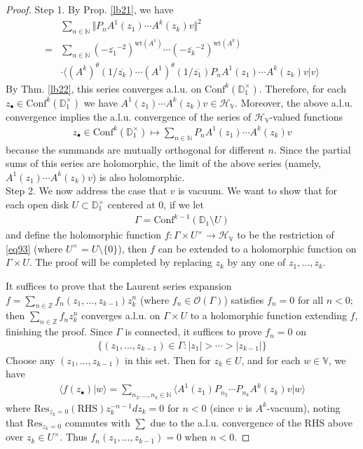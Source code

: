 \documentclass[12pt,b5paper,notitlepage]{article}
\theoremstyle{definition}
\theoremstyle{plain}
\newcommand{\mc}{\mathcal}
\newcommand{\ovl}{\overline}
\newcommand{\Conf}{\mathrm{Conf}}
\newcommand{\Res}{\mathrm{Res}}
\newcommand{\bk}[1]{\langle {#1}\rangle}
\newcommand{\scr}{\mathscr}
\newcommand{\blt}{\bullet}
\newcommand{\Vbb}{\mathbb V}
\newcommand{\Nbb}{\mathbb N}
\newcommand{\Zbb}{\mathbb Z}
\newcommand{\Dbb}{\mathbb D}
\newcommand{\wt}{\mathrm{wt}}
\newcommand{\HV}{\mathcal H_{\mathbb V}}
\numberwithin{equation}{section}
\begin{document}
\begin{proof}
Step 1. By Prop. \ref{lb21}, we have
\begin{align*}
&\sum_{n\in\Nbb}\Vert P_n  A^1(z_1)\cdots A^k(z_k)v\Vert^2\\
=&\sum_{n\in\Nbb}(-\ovl{z_1}^{-2})^{\wt(A^1)}\cdots(-\ovl{z_k}^{-2})^{\wt(A^k)}\\
&\cdot\bk{(A^k)^\theta(1/\ovl{z_k})\cdots (A^1)^\theta(1/\ovl{z_1})P_nA^1(z_1)\cdots A^k(z_k)v|v}
\end{align*}
By Thm. \ref{lb22}, this series converges a.l.u. on $\Conf^k(\Dbb_1^\times)$. Therefore, for each $z_\blt\in \Conf^k(\Dbb_1^\times)$ we have $A^1(z_1)\cdots A^k(z_k)v\in\mc H_\Vbb$. Moreover, the above a.l.u. convergence implies the a.l.u. convergence of the series of $\mc H_\Vbb$-valued functions
\begin{align*}
z_\blt\in\Conf^k(\Dbb_1^\times)\mapsto\sum_{n\in\Nbb}P_n A^1(z_1)\cdots A^k(z_k)v
\end{align*}
because the summands are mutually orthogonal for different $n$. Since the partial sums of this series are holomorphic, the limit of the above series (namely, $A^1(z_1)\cdots A^k(z_k)v$) is also holomorphic.\\[-1ex]

Step 2. We now address the case that $v$ is vacuum. We want to show that for each open disk $U\subset\Dbb_1^\times$ centered at $0$, if we let
\begin{align*}
\Gamma=\Conf^{k-1}(\Dbb_1\setminus U)
\end{align*} 
and define the holomorphic function $f:\Gamma\times U^\times\rightarrow\HV$ to be the restriction of \eqref{eq93} (where $U^\times=U\setminus\{0\}$), then $f$ can be extended to a holomorphic function on $\Gamma\times U$. The proof will be completed by replacing $z_k$ by any one of $z_1,\dots,z_k$. 

It suffices to prove that the Laurent series expansion $f=\sum_{n\in\Zbb}f_n(z_1,\dots,z_{k-1})z_k^n$ (where $f_n\in\scr O(\Gamma)$) satisfies $f_n=0$ for all $n<0$; then $\sum_{n\in\Zbb}f_nz_k^n$ converges a.l.u. on $\Gamma\times U$ to a holomorphic function extending $f$, finishing the proof. Since $\Gamma$ is connected, it suffices to prove $f_n=0$ on 
\begin{align*}
\{(z_1,\dots,z_{k-1})\in\Gamma:|z_1|>\cdots>|z_{k-1}|\}
\end{align*}
Choose any $(z_1,\dots,z_{k-1})$ in this set. Then for $z_k\in U$, and for each $w\in \Vbb$, we have
\begin{align*}
\bk{f(z_\blt)|w}=\sum_{n_2,\dots,n_k\in\Nbb} \bk{A^1(z_1)P_{n_2}\cdots P_{n_k}A^k(z_k)v|w}
\end{align*}
where  $\Res_{z_k=0}(\text{RHS})z_k^{-n-1}dz_k=0$ for $n<0$ (since $v$ is $A^k$-vacuum), noting that $\Res_{z_k=0}$ commutes with $\sum$ due to the a.l.u. convergence of the RHS above over $z_k\in U^\times$. Thus $f_n(z_1,\dots,z_{k-1})=0$ when $n<0$.
\end{proof}
\end{document}

